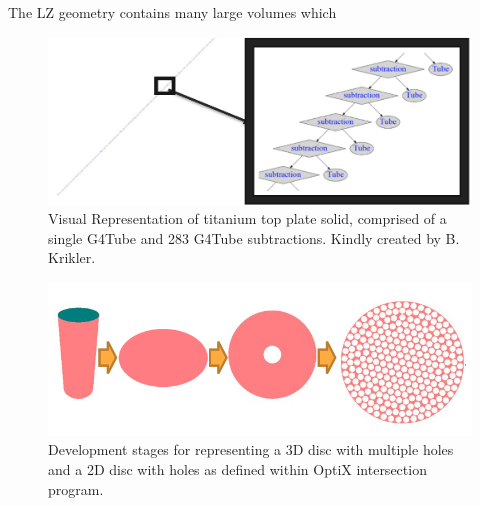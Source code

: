 \par
The LZ geometry contains many large volumes which


\begin{figure}[!htbp]
\includegraphics[width=\textwidth]{Figures/Simulations/unbalanced_ptfe.png}
\centering
\caption{Visual Representation of titanium top plate solid, comprised of a single G4Tube and 283 G4Tube subtractions. Kindly created by B. Krikler.}
\label{fig:Opticks_unbalanced_shape}
\end{figure}



\begin{figure}[!htbp]
\includegraphics[width=\textwidth]{Figures/Simulations/opticks_PTFE_primative.png}
\centering
\caption{Development stages for representing a 3D disc with multiple holes and a 2D disc with holes as defined within OptiX intersection program.}
\label{fig:Opticks_PTFE_primative}
\end{figure}


